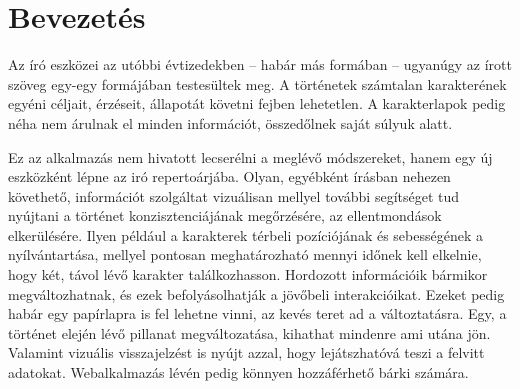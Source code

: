 \chapter{Bevezetés}
\label{ch:intro}

Az író eszközei az utóbbi évtizedekben -- habár más formában -- ugyanúgy az írott szöveg egy-egy formájában testesültek meg. A történetek számtalan karakterének egyéni céljait, érzéseit, állapotát követni fejben lehetetlen. A karakterlapok pedig néha nem árulnak el minden információt, összedőlnek saját súlyuk alatt.

Ez az alkalmazás nem hivatott lecserélni a meglévő módszereket, hanem egy új eszközként lépne az iró repertoárjába. Olyan, egyébként írásban nehezen követhető, információt szolgáltat vizuálisan mellyel további segítséget tud nyújtani a történet konzisztenciájának megőrzésére, az ellentmondások elkerülésére. Ilyen például a karakterek térbeli pozíciójának és sebességének a nyílvántartása, mellyel pontosan meghatározható mennyi időnek kell elkelnie, hogy két, távol lévő karakter találkozhasson. Hordozott információik bármikor megváltozhatnak, és ezek befolyásolhatják a jövőbeli interakcióikat. Ezeket pedig habár egy papírlapra is fel lehetne vinni, az kevés teret ad a változtatásra. Egy, a történet elején lévő pillanat megváltozatása, kihathat mindenre ami utána jön. Valamint vizuális visszajelzést is nyújt azzal, hogy lejátszhatóvá teszi a felvitt adatokat. Webalkalmazás lévén pedig könnyen hozzáférhető bárki számára.
